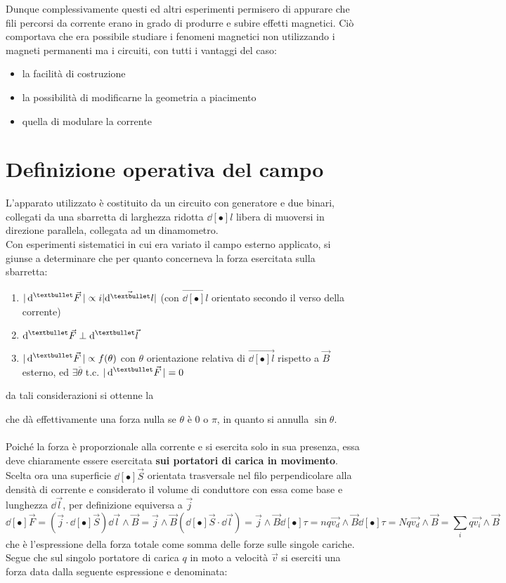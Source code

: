 Dunque complessivamente questi ed altri esperimenti permisero di appurare che fili percorsi da corrente erano in grado di produrre e subire effetti magnetici. Ciò comportava che era possibile studiare i fenomeni magnetici non utilizzando i magneti permanenti ma i circuiti, con tutti i vantaggi del caso:
\begin{itemize}
\item la facilità di costruzione
\item la possibilità di modificarne la geometria a piacimento
\item quella di modulare la corrente
\end{itemize}

\section{Definizione operativa del campo}
L'apparato utilizzato è costituito da un circuito con generatore e due binari, collegati da una sbarretta di larghezza ridotta $\dd[•]{l}$ libera di muoversi in direzione parallela, collegata ad un dinamometro. 
\\Con esperimenti sistematici in cui era variato il campo esterno applicato, si giunse a determinare che per quanto concerneva la forza esercitata sulla sbarretta:
\begin{enumerate}
\item $\ds |\dd[•]{\vec{F}}| \propto i |\vec{\dd[•]{l}}|$ (con $\vec{\dd[•]{l}}$ orientato secondo il verso della corrente)
\item $\ds \dd[•]{\vec{F}} \perp \dd[•]{\vec{l}}$
\item $\ds |\dd[•]{\vec{F}}| \propto f(\theta)$ con $\theta$ orientazione relativa di $\vec{\dd[•]{l}}$ rispetto a $\vec{B}$ esterno, ed $\exists \overline{\theta}$ t.c. $\ds |\dd[•]{\vec{F}}| = 0$
\end{enumerate}
da tali considerazioni si ottenne la


che dà effettivamente una forza nulla se $\theta$ è $0$ o $\pi$, in quanto si annulla $\sin \theta$. 
\\~\\
Poiché la forza è proporzionale alla corrente e si esercita solo in sua presenza, essa deve chiaramente essere esercitata \textbf{sui portatori di carica in movimento}.
\\Scelta ora una superficie $\dd[•]{\vec{S}}$ orientata trasversale nel filo perpendicolare alla densità di corrente e considerato il volume di conduttore con essa come base e lunghezza $\dd{\vec{l}}$, per definizione equiversa a $\vec{j}$
\[\dd[•]{\vec{F}} = (\vec{j} \cdot \dd[•]{\vec{S}}) \dd{\vec{l}} \wedge \vec{B} = \vec{j} \wedge \vec{B} (\dd[•]{\vec{S}} \cdot \dd{\vec{l}}) = \vec{j} \wedge \vec{B} \dd[•]{\tau} = n q \vec{v_d} \wedge \vec{B} \dd[•]{\tau} = N q \vec{v_d} \wedge \vec{B} = \sum_i q \vec{v_i} \wedge \vec{B}\]
che è l'espressione della forza totale come somma delle forze sulle singole cariche. Segue che sul singolo portatore di carica $q$ in moto a velocità $\vec{v}$ si eserciti una forza data dalla seguente espressione e denominata:

